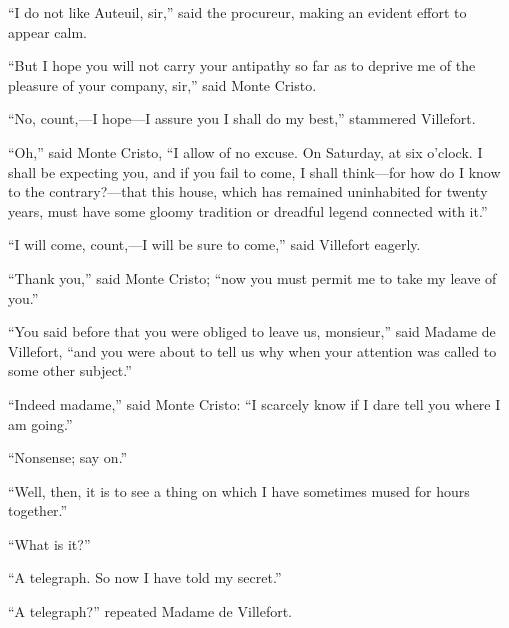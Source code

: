 “I do not like Auteuil, sir,” said the procureur, making an evident
effort to appear calm.

“But I hope you will not carry your antipathy so far as to deprive me
of the pleasure of your company, sir,” said Monte Cristo.

“No, count,—I hope—I assure you I shall do my best,” stammered
Villefort.

“Oh,” said Monte Cristo, “I allow of no excuse. On Saturday, at six
o’clock. I shall be expecting you, and if you fail to come, I shall
think—for how do I know to the contrary?—that this house, which has
remained uninhabited for twenty years, must have some gloomy tradition
or dreadful legend connected with it.”

“I will come, count,—I will be sure to come,” said Villefort eagerly.

“Thank you,” said Monte Cristo; “now you must permit me to take my
leave of you.”

“You said before that you were obliged to leave us, monsieur,” said
Madame de Villefort, “and you were about to tell us why when your
attention was called to some other subject.”

“Indeed madame,” said Monte Cristo: “I scarcely know if I dare tell you
where I am going.”

“Nonsense; say on.”

“Well, then, it is to see a thing on which I have sometimes mused for
hours together.”

“What is it?”

“A telegraph. So now I have told my secret.”

“A telegraph?” repeated Madame de Villefort.

